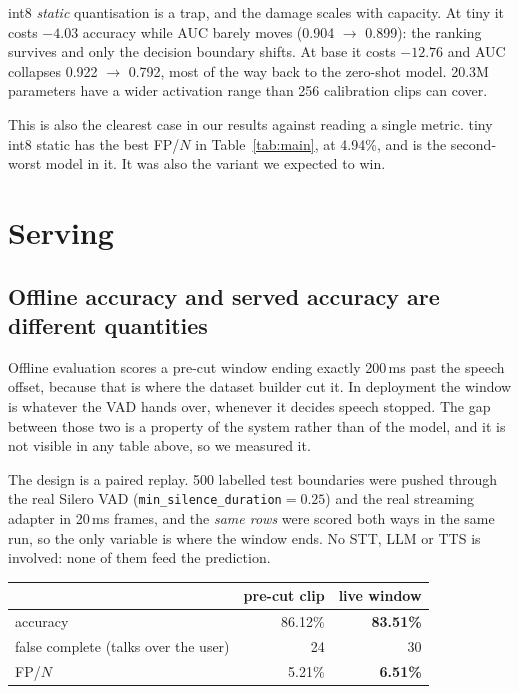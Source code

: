 \documentclass[11pt]{article}
\newcommand{\pct}{\%}
\begin{document}
int8 \emph{static} quantisation is a trap, and the damage scales with capacity.
At tiny it costs $-4.03$ accuracy while AUC barely moves (0.904 $\rightarrow$
0.899): the ranking survives and only the decision boundary shifts. At base it
costs $-12.76$ and AUC collapses 0.922 $\rightarrow$ 0.792, most of the way back
to the zero-shot model. 20.3M parameters have a wider activation range than 256
calibration clips can cover.

This is also the clearest case in our results against reading a single metric.
tiny int8 static has the best FP/$N$ in Table~\ref{tab:main}, at 4.94\pct{}, and
is the second-worst model in it. It was also the variant we expected to win.

\section{Serving}
\label{sec:serving}

\subsection{Offline accuracy and served accuracy are different quantities}
\label{sec:paired-replay}

Offline evaluation scores a pre-cut window ending exactly 200\,ms past the
speech offset, because that is where the dataset builder cut it. In deployment
the window is whatever the VAD hands over, whenever it decides speech stopped.
The gap between those two is a property of the system rather than of the model,
and it is not visible in any table above, so we measured it.

The design is a paired replay. 500 labelled test boundaries were pushed through
the real Silero VAD (\texttt{min\_silence\_duration}$=0.25$) and the real
streaming adapter in 20\,ms frames, and the \emph{same rows} were scored both
ways in the same run, so the only variable is where the window ends. No STT, LLM
or TTS is involved: none of them feed the prediction.

\begin{center}\small
\begin{tabular}{lrr}
\toprule
& pre-cut clip & live window \\
\midrule
accuracy & 86.12\pct & \textbf{83.51\pct} \\
false complete (talks over the user) & 24 & 30 \\
FP/$N$ & 5.21\pct & \textbf{6.51\pct} \\
\bottomrule
\end{tabular}
\end{center}
\end{document}
